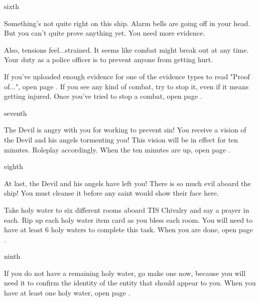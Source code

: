 \documentclass[greennotebook]{guildcamp4} %
\begin{document}
\begin{page}{sixth}

Something's not quite right on this ship. Alarm bells are going off in your head. But you can't quite prove anything yet. You need more evidence.

Also, tensions feel...strained. It seems like combat might break out at any time. Your duty as a police officer is to prevent anyone from getting hurt.

If you've uploaded enough evidence for one of the evidence types to read "Proof of...", open page .
If you see any kind of combat, try to stop it, even if it means getting injured. Once you've tried to stop a combat, open page .

\end{page}

\begin{page}{seventh}

The Devil is angry with you for working to prevent sin! You receive a vision of the Devil and his angels tormenting you! This vision will be in effect for ten minutes. Roleplay accordingly. When the ten minutes are up, open page .

\end{page}

\begin{page}{eighth}

At last, the Devil and his angels have left you! There is so much evil aboard the ship! You must cleanse it before any saint would show their face here.

Take holy water to six different rooms aboard TIS Chivalry and say a prayer in each. Rip up each holy water item card as you bless each room. You will need to have at least 6 holy waters to complete this task. When you are done, open page .

\end{page}

\begin{page}{ninth}

If you do not have a remaining holy water, go make one now, because you will need it to confirm the identity of the entity that should appear to you. When you have at least one holy water, open page .

\end{page}
\end{document}
